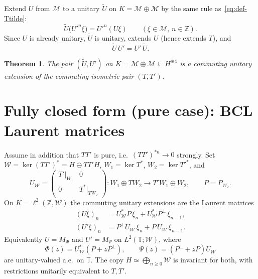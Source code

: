 \documentclass[11pt]{article}
\newtheorem{theorem}{Theorem}
\begin{document}
Extend \(U\) from \(\mathcal{M}\) to a unitary \(\widetilde{U}\) on
\(K=\mathcal{M}\oplus\mathcal{M}\) by the same rule as~\eqref{eq:def-Ttilde}:
\begin{equation}
\label{eq:extend-U}
\widetilde{U}\bigl({U'}^n\xi\bigr)={U'}^n(U\xi)
\qquad(\xi\in\mathcal{M},\,n\in\mathbb{Z}).
\end{equation}
Since \(U\) is already unitary, \(\widetilde{U}\) is unitary, extends \(U\) (hence extends \(T\)),
and
\[
\widetilde{U}\,U'=U'\,\widetilde{U}.
\]

\begin{theorem}
The pair \((\widetilde{U},U')\) on \(K=\mathcal{M}\oplus\mathcal{M}\subseteq H^{\oplus 4}\) is a
commuting unitary extension of the commuting isometric pair \((T,T')\).
\end{theorem}

\section*{Fully closed form (pure case): BCL Laurent matrices}

Assume in addition that \(TT'\) is pure, i.e.\ \((TT')^{*n}\to 0\) strongly.
Set \(\mathcal{W}=\ker(TT')^*=H\ominus TT'H\), \(W_1=\ker T^*\), \(W_2=\ker{T'}^*\), and
\begin{equation}
\label{eq:UW}
U_{\mathcal{W}}
=
\begin{pmatrix}
T'\big|_{W_1} & 0 \\
0 & T^*\big|_{TW_2}
\end{pmatrix}
:W_1\oplus TW_2\to T'W_1\oplus W_2,
\qquad
P=P_{W_2}.
\end{equation}
On \(K=\ell^2(\mathbb{Z},\mathcal{W})\) the commuting unitary extensions are the Laurent
matrices
\begin{equation}
\label{eq:BCL}
\boxed{
\begin{aligned}
(U\xi)_n
&=
U_{\mathcal{W}}^*P\,\xi_n
+
U_{\mathcal{W}}^*P^\perp\,\xi_{n-1},
\\[1mm]
(U'\xi)_n
&=
P^\perp U_{\mathcal{W}}\,\xi_n
+
P\,U_{\mathcal{W}}\,\xi_{n-1}.
\end{aligned}
}
\end{equation}
Equivalently \(U=M_{\Phi}\) and \(U'=M_{\Psi}\) on \(L^2(\mathbb{T};\mathcal{W})\), where
\[
\Phi(z)=U_{\mathcal{W}}^*(P+zP^\perp),
\qquad
\Psi(z)=(P^\perp+zP)U_{\mathcal{W}}
\]
are unitary-valued a.e.\ on \(\mathbb{T}\). The copy \(H\simeq\bigoplus_{n\ge 0}\mathcal{W}\) is
invariant for both, with restrictions unitarily equivalent to \(T,T'\).
\end{document}
